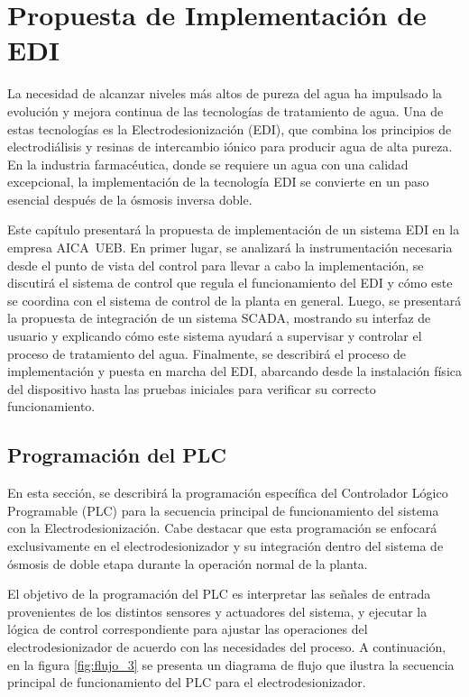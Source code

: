 \chapter{Propuesta de Implementación de EDI}
\label{cap:propuesta_implementacion}
\vspace{-2cm} 
La necesidad de alcanzar niveles más altos de pureza del agua ha impulsado
la evolución y mejora continua de las tecnologías de tratamiento de agua.
Una de estas tecnologías es la Electrodesionización (EDI), que combina
los principios de electrodiálisis y resinas de intercambio iónico para
producir agua de alta pureza. En la industria farmacéutica, donde se
requiere un agua con una calidad excepcional, la implementación de la
tecnología EDI se convierte en un paso esencial después de la ósmosis inversa doble.

Este capítulo presentará la propuesta de implementación de un sistema
EDI en la empresa AICA UEB. En primer lugar, se analizará la instrumentación
necesaria desde el punto de vista del control para llevar a cabo la implementación, se discutirá el sistema de
control que regula el funcionamiento del EDI y cómo este se coordina
con el sistema de control de la planta en general.
Luego, se presentará la propuesta de integración de un sistema SCADA,
mostrando su interfaz de usuario y explicando cómo este sistema
ayudará a supervisar y controlar el proceso de tratamiento del agua.
Finalmente, se describirá el proceso de implementación y puesta en marcha del
EDI, abarcando desde la instalación física del dispositivo hasta las pruebas
iniciales para verificar su correcto funcionamiento.




\section{Programación del PLC}
\label{sec:sistema_control}
En esta sección, se describirá la programación específica del Controlador
Lógico Programable (PLC) para la secuencia principal de funcionamiento del
sistema con la Electrodesionización. Cabe destacar que esta programación
se enfocará exclusivamente en el electrodesionizador y su integración dentro
del sistema de ósmosis de doble etapa durante la operación normal de la planta.

El objetivo de la programación del PLC es interpretar las señales de entrada
provenientes de los distintos sensores y actuadores del sistema, y ejecutar
la lógica de control correspondiente para ajustar las operaciones del
electrodesionizador de acuerdo con las necesidades del proceso.
A continuación, en la figura \ref{fig:flujo_3} se presenta un diagrama de flujo que ilustra la
secuencia principal de funcionamiento del PLC para el electrodesionizador.

